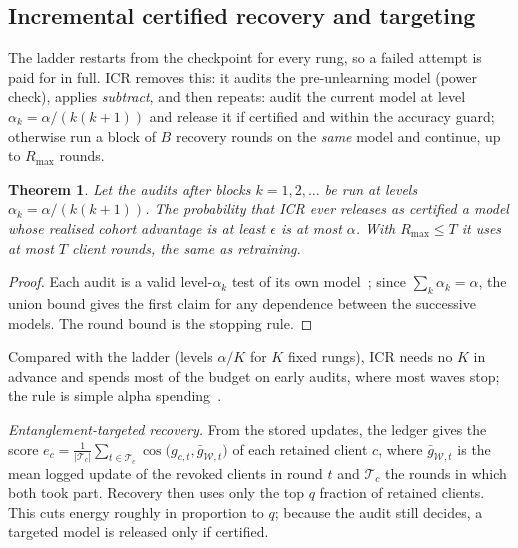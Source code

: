 \documentclass[journal]{IEEEtran}
\newtheorem{theorem}{Theorem}
\begin{document}
\subsection{Incremental certified recovery and targeting}
The ladder restarts from the checkpoint for every rung, so a failed attempt is paid for in full. ICR removes this: it audits the pre-unlearning model (power check), applies \emph{subtract}, and then repeats: audit the current model at level $\alpha_k=\alpha/(k(k{+}1))$ and release it if certified and within the accuracy guard; otherwise run a block of $B$ recovery rounds on the \emph{same} model and continue, up to $R_{\max}$ rounds.

\begin{theorem}\label{thm:icr}
Let the audits after blocks $k=1,2,\dots$ be run at levels $\alpha_k=\alpha/(k(k{+}1))$. The probability that ICR ever releases as certified a model whose realised cohort advantage is at least $\epsilon$ is at most $\alpha$. With $R_{\max}\le T$ it uses at most $T$ client rounds, the same as retraining.
\end{theorem}
\begin{proof}
Each audit is a valid level-$\alpha_k$ test of its own model~\cite{dang2026vouch}; since $\sum_k\alpha_k=\alpha$, the union bound gives the first claim for any dependence between the successive models. The round bound is the stopping rule.
\end{proof}
Compared with the ladder (levels $\alpha/K$ for $K$ fixed rungs), ICR needs no $K$ in advance and spends most of the budget on early audits, where most waves stop; the rule is simple alpha spending~\cite{landemets1983}.

\emph{Entanglement-targeted recovery.} From the stored updates, the ledger gives the score $e_c=\frac1{|\mathcal T_c|}\sum_{t\in\mathcal T_c}\cos\!\big(g_{c,t},\bar g_{\mathcal W,t}\big)$ of each retained client $c$, where $\bar g_{\mathcal W,t}$ is the mean logged update of the revoked clients in round $t$ and $\mathcal T_c$ the rounds in which both took part. Recovery then uses only the top $q$ fraction of retained clients. This cuts energy roughly in proportion to $q$; because the audit still decides, a targeted model is released only if certified.
\end{document}
